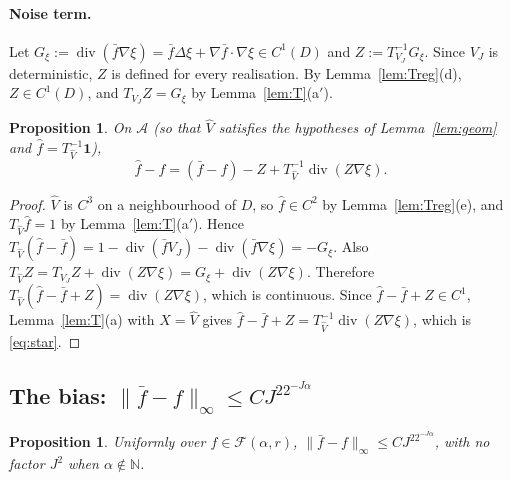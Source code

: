 \documentclass[11pt]{article}
\newtheorem{proposition}[theorem]{Proposition}
\theoremstyle{definition}
\theoremstyle{remark}
\newcommand{\one}{\mathbf 1}
\newcommand{\Fc}{\mathcal F}
\newcommand{\dv}{\operatorname{div}}
\newcommand{\cA}{\mathcal A}
\begin{document}
\paragraph{Noise term.} Let $G_\xi:=\dv(\bar f\nabla\xi)=\bar f\Delta\xi+\nabla\bar f\cdot\nabla\xi\in C^1(D)$ and $Z:=T^{-1}_{V_J}G_\xi$. Since $V_J$ is deterministic, $Z$ is defined for every realisation. By Lemma~\ref{lem:Treg}(d), $Z\in C^1(D)$, and $T_{V_J}Z=G_\xi$ by Lemma~\ref{lem:T}(a$'$).

\begin{proposition}\label{prop:star}
On $\cA$ (so that $\hat V$ satisfies the hypotheses of Lemma~\ref{lem:geom} and $\hat f=T^{-1}_{\hat V}\one$),
\begin{equation}\label{eq:star}
\hat f-f=(\bar f-f)-Z+T^{-1}_{\hat V}\dv(Z\nabla\xi).
\end{equation}
\end{proposition}

\begin{proof}
$\hat V$ is $C^3$ on a neighbourhood of $D$, so $\hat f\in C^2$ by Lemma~\ref{lem:Treg}(e), and $T_{\hat V}\hat f=1$ by Lemma~\ref{lem:T}(a$'$). Hence
$T_{\hat V}(\hat f-\bar f)=1-\dv(\bar fV_J)-\dv(\bar f\nabla\xi)=-G_\xi$.
Also $T_{\hat V}Z=T_{V_J}Z+\dv(Z\nabla\xi)=G_\xi+\dv(Z\nabla\xi)$. Therefore $T_{\hat V}(\hat f-\bar f+Z)=\dv(Z\nabla\xi)$, which is continuous. Since $\hat f-\bar f+Z\in C^1$, Lemma~\ref{lem:T}(a) with $X=\hat V$ gives $\hat f-\bar f+Z=T^{-1}_{\hat V}\dv(Z\nabla\xi)$, which is \eqref{eq:star}.
\end{proof}

\subsection{\texorpdfstring{The bias: $\|\bar f-f\|_\infty\le CJ^22^{-J\alpha}$}{The bias}}

\begin{proposition}\label{prop:bias}
Uniformly over $f\in\Fc(\alpha,r)$, $\|\bar f-f\|_\infty\le CJ^22^{-J\alpha}$, with no factor $J^2$ when $\alpha\notin\mathbb N$.
\end{proposition}
\end{document}
